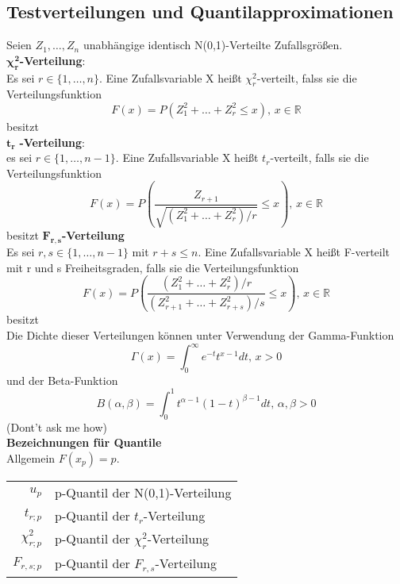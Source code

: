 \documentclass[
	ngerman,
	accentcolor=9c,%
	type=intern,
	marginpar=false
	]{tudapub}
\begin{document}
        \subsection{Testverteilungen und Quantilapproximationen}
        Seien $Z_1,\dots,Z_n$ unabhängige identisch N(0,1)-Verteilte Zufallsgrößen.\\[2ex]
        $\mathbf{\chi_r^2}$\textbf{-Verteilung}:\\
        Es sei $r\in\{1,\dots,n\}$. Eine Zufallsvariable X heißt $\chi_r^2$-verteilt, falss sie die Verteilungsfunktion 
        \begin{equation*}
            F(x) = P(Z_1^2+\dots+Z_r^2 \leq x)\mbox{, } x\in \mathbb{R}
        \end{equation*}
        besitzt\\[2ex]
       $\mathbf{t_r}$ \textbf{-Verteilung}:\\
        es sei $r \in \{1,\dots,n-1\}$. Eine Zufallsvariable X heißt $t_r$-verteilt, falls sie die Verteilungsfunktion
        \begin{equation*}
            F(x) = P \left(
                \dfrac{Z_{r+1}}{\sqrt{(Z_1^2+\dots+Z_r^2)/r}} \leq x
            \right) \mbox{, } x \in \mathbb{R}
        \end{equation*}
        besitzt
        $\mathbf{F_{r,s}}$\textbf{-Verteilung}\\
        Es sei $r,s \in \{1,\dots,n-1\}$ mit $r+s\leq n$. 
        Eine Zufallsvariable X heißt F-verteilt mit r und s Freiheitsgraden, falls sie die Verteilungsfunktion
        \begin{equation*}
            F(x) = P\left(
                \dfrac{(Z_1^2+\dots+Z_r^2)/r}{(Z_{r+1}^2+ \dots + Z_{r+s}^2)/s} \leq x
            \right)\mbox{, }x \in \mathbb{R}
        \end{equation*} besitzt\\

        Die Dichte dieser Verteilungen können unter Verwendung der Gamma-Funktion
        \begin{equation*}
            \Gamma(x)=\int_0^\infty e^{-t}t^{x-1}dt\mbox{, }x>0
        \end{equation*}
        und der Beta-Funktion
        \begin{equation*}
            B(\alpha, \beta)= \int_0^1 t^{\alpha-1}(1-t)^{\beta-1}dt \mbox{, }\alpha, \beta > 0
        \end{equation*}
        (Dont't ask me how)\\[2ex]
        \textbf{Bezeichnungen für Quantile}\\
        Allgemein $F(x_p)=p$.
        \begin{center}
            \begin{tabular}{r l}
                $u_p$ & p-Quantil der N(0,1)-Verteilung\\
                $t_{r;p}$ & p-Quantil der $t_r$-Verteilung\\
                $\chi^2_{r;p}$ & p-Quantil der $\chi_r^2$-Verteilung\\
                $F_{r,s;p}$ & p-Quantil der $F_{r,s}$-Verteilung\\
            \end{tabular}
        \end{center}
\end{document}
